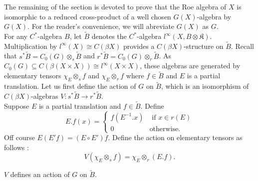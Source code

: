 The remaining of the section is devoted to prove that the Roe algebra of $X$ is isomorphic to a reduced cross-product of a well chosen $G(X)$-algebra by $G(X)$. For the reader's convenience, we will abreviate $G(X)$ as $G$.\\

For any $C^*$-algebra $B$, let $\tilde B$ denotes the $C^*$-algebra $l^\infty(X,B\otimes\mathfrak K)$. Multiplication by $l^\infty(X)\cong C(\beta X)$ provides a $C(\beta X)$-structure on $\tilde B$. Recall that $s^* \tilde B = C_0(G)\otimes_s \tilde B$ and $r^* \tilde B = C_0(G)\otimes_r \tilde B$. As $C_0(G)\subseteq C(\beta(X\times X))\cong l^\infty(X\times X)$, these algebras are generated by elementary tensors $\chi_E\otimes_s f$ and $\chi_E\otimes_r f$ where $f\in\tilde B$ and $E$ is a partial translation. Let us first define the action of $G$ on $\tilde B$, which is an isomorphism of $C(\beta X)$-algebras $V :s^* \tilde B\rightarrow r^* \tilde B$.\\

Suppose $E$ is a partial translation and $f\in\tilde B$. Define 
\[E.f(x) = \left\{\begin{array}{ll} f(E^{-1}.x) & \text{ if }x\in r(E)\\ 0 & \text{otherwise.}\end{array}\right.\]
Off course $E(E'f)=(E\circ E')f$. Define the action on elementary tensors as follows :
\[V(\chi_E \otimes_s f) = \chi_E \otimes_r (E.f).\]

\begin{lem}
$V$ defines an action of $G$ on $\tilde B$.
\end{lem}

